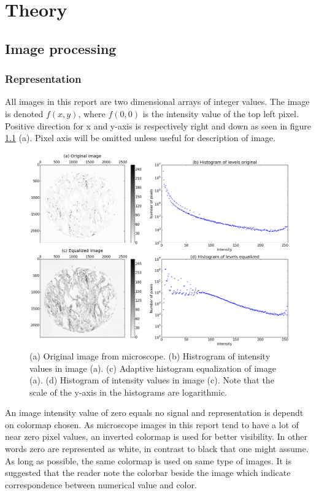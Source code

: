 \chapter{Theory}

%
%
\section{Image processing}
\subsection{Representation}
All images in this report are two dimensional arrays of integer values. The image is denoted $f(x,y)$, where $f(0,0)$ is the intensity value of the top left pixel. Positive direction for x and y-axis is respectively right and down as seen in figure \ref{fig:equalized} (a). Pixel axis will be omitted unless useful for description of image.

\begin{figure}
\centering
\includegraphics[width=14cm]{equalized}
\caption{(a) Original image from microscope. (b) Histrogram of intensity values in image (a). (c) Adaptive histogram equalization of image (a). (d) Histogram of intensity values in image (c). Note that the scale of the y-axis in the histograms are logarithmic. }
\label{fig:equalized}
\end{figure}

An image intensity value of zero equals no signal and representation is dependt on colormap chosen. As microscope images in this report tend to have a lot of near zero pixel values, an inverted colormap is used for better visibility. In other words zero are represented as white, in contrast to black that one might assume. As long as possible, the same colormap is used on same type of images. It is suggested that the reader note the colorbar beside the image which indicate correspondence between numerical value and color.

